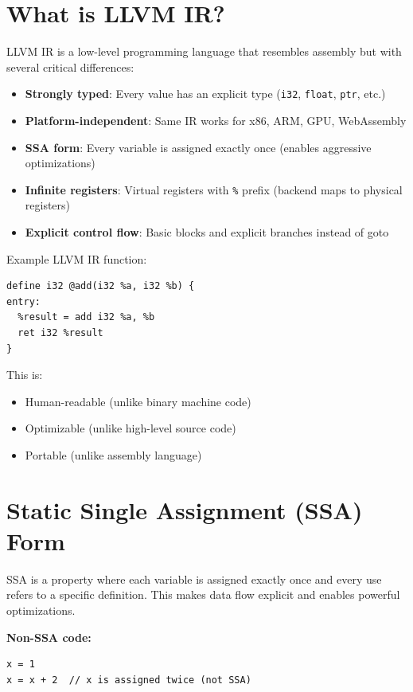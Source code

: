 \documentclass[11pt,oneside]{book}
\begin{document}
\section{What is LLVM IR?}
LLVM IR is a low-level programming language that resembles assembly but with several critical differences:

\begin{itemize}[noitemsep]
  \item \textbf{Strongly typed}: Every value has an explicit type (\texttt{i32}, \texttt{float}, \texttt{ptr}, etc.)
  \item \textbf{Platform-independent}: Same IR works for x86, ARM, GPU, WebAssembly
  \item \textbf{SSA form}: Every variable is assigned exactly once (enables aggressive optimizations)
  \item \textbf{Infinite registers}: Virtual registers with \texttt{\%} prefix (backend maps to physical registers)
  \item \textbf{Explicit control flow}: Basic blocks and explicit branches instead of goto
\end{itemize}

Example LLVM IR function:
\begin{lstlisting}[style=ir]
define i32 @add(i32 %a, i32 %b) {
entry:
  %result = add i32 %a, %b
  ret i32 %result
}
\end{lstlisting}

This is:
\begin{itemize}[noitemsep]
  \item Human-readable (unlike binary machine code)
  \item Optimizable (unlike high-level source code)
  \item Portable (unlike assembly language)
\end{itemize}

\section{Static Single Assignment (SSA) Form}

SSA is a property where each variable is assigned exactly once and every use refers to a specific definition. This makes data flow explicit and enables powerful optimizations.

\textbf{Non-SSA code:}
\begin{lstlisting}[style=ir]
x = 1
x = x + 2  // x is assigned twice (not SSA)
\end{lstlisting}
\end{document}
